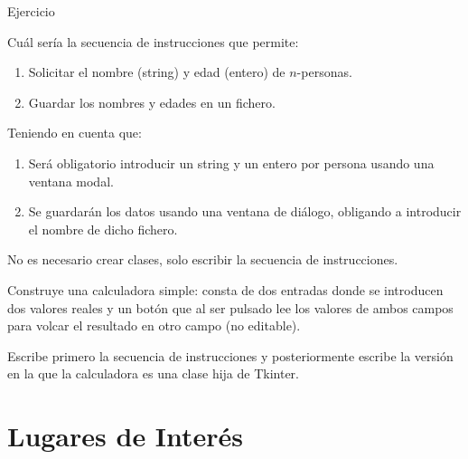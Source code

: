 \documentclass[10pt, envcountsect , spanish]{beamer}
\begin{document}
\begin{frame}{Ejercicio} 

\begin{ejercicio}{}
Cuál sería la secuencia de instrucciones que permite:

\begin{enumerate}
\item Solicitar el nombre (string) y edad (entero) de $n$-personas.
\item Guardar los nombres y edades en un fichero.
\end{enumerate}

Teniendo en cuenta que:
\begin{enumerate}
\item Será obligatorio introducir un string y un entero por persona usando una ventana modal.
\item Se guardarán los datos usando una ventana de diálogo, obligando a introducir el nombre de dicho fichero.
\end{enumerate}

No es necesario crear clases, solo escribir la secuencia de instrucciones.

\end{ejercicio}

\begin{ejercicio}{}
Construye una calculadora simple: consta de dos entradas donde se introducen dos valores reales y un botón que al ser pulsado lee los valores de ambos campos para volcar el resultado en otro campo (no editable).

Escribe primero la secuencia de instrucciones y posteriormente escribe la versión en la que la calculadora es una clase hija de Tkinter.
\end{ejercicio}

\end{frame}




\section{Lugares de Interés}
\end{document}
